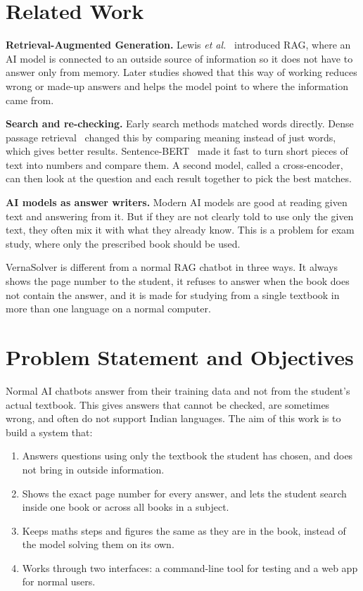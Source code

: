 \documentclass[conference]{IEEEtran}
\begin{document}
\section{Related Work}
\textbf{Retrieval-Augmented Generation.} Lewis \textit{et
al.}~\cite{lewis2020rag} introduced RAG, where an AI model is connected
to an outside source of information so it does not have to answer only
from memory. Later studies showed that this way of working reduces wrong
or made-up answers and helps the model point to where the information
came from.

\textbf{Search and re-checking.} Early search methods matched words
directly. Dense passage retrieval~\cite{karpukhin2020dpr} changed this by
comparing meaning instead of just words, which gives better results.
Sentence-BERT~\cite{reimers2019sbert} made it fast to turn short pieces
of text into numbers and compare them. A second model, called a
cross-encoder, can then look at the question and each result together to
pick the best matches.

\textbf{AI models as answer writers.} Modern AI models are good at
reading given text and answering from it. But if they are not clearly
told to use only the given text, they often mix it with what they
already know. This is a problem for exam study, where only the
prescribed book should be used.

VernaSolver is different from a normal RAG chatbot in three ways. It
always shows the page number to the student, it refuses to answer when
the book does not contain the answer, and it is made for studying from a
single textbook in more than one language on a normal computer.

\section{Problem Statement and Objectives}
Normal AI chatbots answer from their training data and not from the
student's actual textbook. This gives answers that cannot be checked,
are sometimes wrong, and often do not support Indian languages. The aim
of this work is to build a system that:
\begin{enumerate}
\item Answers questions using only the textbook the student has chosen,
and does not bring in outside information.
\item Shows the exact page number for every answer, and lets the student
search inside one book or across all books in a subject.
\item Keeps maths steps and figures the same as they are in the book,
instead of the model solving them on its own.
\item Works through two interfaces: a command-line tool for testing and
a web app for normal users.
\end{enumerate}
\end{document}
